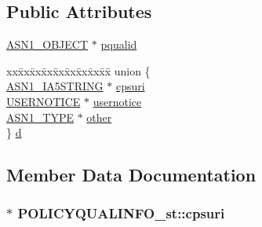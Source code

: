 \subsection*{Public Attributes}
\begin{DoxyCompactItemize}
\item 
\hyperlink{asn1_8h_ae10c08e4e6b23f67a39b2add932ec48f}{A\+S\+N1\+\_\+\+O\+B\+J\+E\+CT} $\ast$ \hyperlink{struct_p_o_l_i_c_y_q_u_a_l_i_n_f_o__st_a88696c938a44a9aa5d6eeb4b326beb10}{pqualid}
\item 
\begin{tabbing}
xx\=xx\=xx\=xx\=xx\=xx\=xx\=xx\=xx\=\kill
union \{\\
\>\hyperlink{ossl__typ_8h_a0d915c339a64c1c9871d5404e51c44fd}{ASN1\_IA5STRING} $\ast$ \hyperlink{struct_p_o_l_i_c_y_q_u_a_l_i_n_f_o__st_a9cadd1d5aaa57277e0b8c8f5df43460f}{cpsuri}\\
\>\hyperlink{x509v3_8h_a98e6354df352bd063ac823ef34ef7923}{USERNOTICE} $\ast$ \hyperlink{struct_p_o_l_i_c_y_q_u_a_l_i_n_f_o__st_aea186ea8d0b5f7c84f0f53ea0f3f6d4e}{usernotice}\\
\>\hyperlink{asn1_8h_a7895e03d9fee2bc4963faf2a31a9439e}{ASN1\_TYPE} $\ast$ \hyperlink{struct_p_o_l_i_c_y_q_u_a_l_i_n_f_o__st_a44e162a24d6bcef3010feda880547deb}{other}\\
\} \hyperlink{struct_p_o_l_i_c_y_q_u_a_l_i_n_f_o__st_a1e0dd937427fb6f1b5fc1c39c74e0760}{d}\\

\end{tabbing}\end{DoxyCompactItemize}


\subsection{Member Data Documentation}
\subsubsection[{\texorpdfstring{cpsuri}{cpsuri}}]{$\ast$ P\+O\+L\+I\+C\+Y\+Q\+U\+A\+L\+I\+N\+F\+O\+\_\+st\+::cpsuri}\hypertarget{struct_p_o_l_i_c_y_q_u_a_l_i_n_f_o__st_a9cadd1d5aaa57277e0b8c8f5df43460f}{}\label{struct_p_o_l_i_c_y_q_u_a_l_i_n_f_o__st_a9cadd1d5aaa57277e0b8c8f5df43460f}
